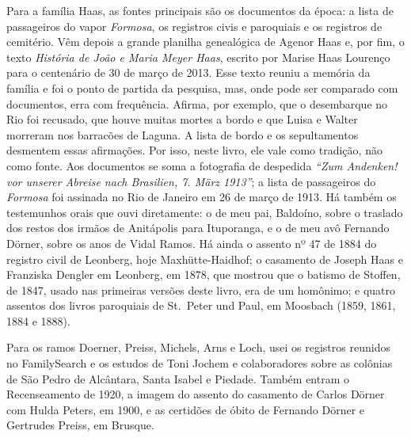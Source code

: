 \documentclass[
  brazilian,
  11pt,
  openany]{book}
\begin{document}
Para a família Haas, as fontes principais são os documentos da época: a
lista de passageiros do vapor \emph{Formosa}, os registros civis e
paroquiais e os registros de cemitério. Vêm depois a grande planilha
genealógica de Agenor Haas e, por fim, o texto \emph{História de João e
Maria Meyer Haas}, escrito por Marise Haas Lourenço para o centenário de
30 de março de 2013. Esse texto reuniu a memória da família e foi o
ponto de partida da pesquisa, mas, onde pode ser comparado com
documentos, erra com frequência. Afirma, por exemplo, que o desembarque
no Rio foi recusado, que houve muitas mortes a bordo e que Luisa e
Walter morreram nos barracões de Laguna. A lista de bordo e os
sepultamentos desmentem essas afirmações. Por isso, neste livro, ele
vale como tradição, não como fonte. Aos documentos se soma a fotografia
de despedida \emph{``Zum Andenken! vor unserer Abreise nach Brasilien,
7. März 1913''}; a lista de passageiros do \emph{Formosa} foi assinada
no Rio de Janeiro em 26 de março de 1913. Há também os testemunhos orais
que ouvi diretamente: o de meu pai, Baldoíno, sobre o traslado dos
restos dos irmãos de Anitápolis para Ituporanga, e o de meu avô Fernando
Dörner, sobre os anos de Vidal Ramos. Há ainda o assento nº 47 de 1884
do registro civil de Leonberg, hoje Maxhütte-Haidhof; o casamento de
Joseph Haas e Franziska Dengler em Leonberg, em 1878, que mostrou que o
batismo de Stoffen, de 1847, usado nas primeiras versões deste livro,
era de um homônimo; e quatro assentos dos livros paroquiais de St.~Peter
und Paul, em Moosbach (1859, 1861, 1884 e 1888).

Para os ramos Doerner, Preiss, Michels, Arns e Loch, usei os registros
reunidos no FamilySearch e os estudos de Toni Jochem e colaboradores
sobre as colônias de São Pedro de Alcântara, Santa Isabel e Piedade.
Também entram o Recenseamento de 1920, a imagem do assento do casamento
de Carlos Dörner com Hulda Peters, em 1900, e as certidões de óbito de
Fernando Dörner e Gertrudes Preiss, em Brusque.
\end{document}
